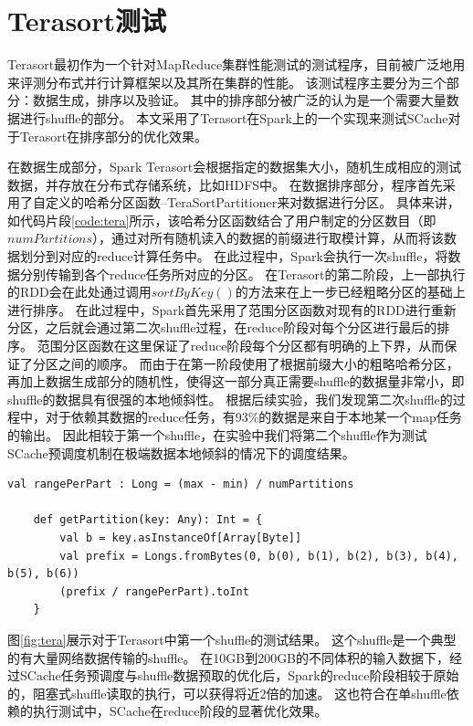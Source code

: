 \section{Terasort测试}

Terasort最初作为一个针对MapReduce集群性能测试的测试程序，目前被广泛地用来评测分布式并行计算框架以及其所在集群的性能。
该测试程序主要分为三个部分：数据生成，排序以及验证。
其中的排序部分被广泛的认为是一个需要大量数据进行shuffle的部分。
本文采用了Terasort在Spark上的一个实现\cite{terasort}来测试SCache对于Terasort在排序部分的优化效果。

在数据生成部分，Spark Terasort会根据指定的数据集大小，随机生成相应的测试数据，并存放在分布式存储系统，比如HDFS中。
在数据排序部分，程序首先采用了自定义的哈希分区函数--TeraSortPartitioner来对数据进行分区。
具体来讲，如代码片段\ref{code:tera}所示，该哈希分区函数结合了用户制定的分区数目（即$numPartitions$），通过对所有随机读入的数据的前缀进行取模计算，从而将该数据划分到对应的reduce计算任务中。
在此过程中，Spark会执行一次shuffle，将数据分别传输到各个reduce任务所对应的分区。
在Terasort的第二阶段，上一部执行的RDD会在此处通过调用$sortByKey()$的方法来在上一步已经粗略分区的基础上进行排序。
在此过程中，Spark首先采用了范围分区函数对现有的RDD进行重新分区，之后就会通过第二次shuffle过程，在reduce阶段对每个分区进行最后的排序。
范围分区函数在这里保证了reduce阶段每个分区都有明确的上下界，从而保证了分区之间的顺序。
而由于在第一阶段使用了根据前缀大小的粗略哈希分区，再加上数据生成部分的随机性，使得这一部分真正需要shuffle的数据量非常小，即shuffle的数据具有很强的本地倾斜性。
根据后续实验，我们发现第二次shuffle的过程中，对于依赖其数据的reduce任务，有93\%的数据是来自于本地某一个map任务的输出。
因此相较于第一个shuffle，在实验中我们将第二个shuffle作为测试SCache预调度机制在极端数据本地倾斜的情况下的调度结果。

\begin{lstlisting}[style={myScalastyle}, caption={Terasort哈希分区函数代码(Scala)}, label={code:tera}]
    val rangePerPart : Long = (max - min) / numPartitions

    def getPartition(key: Any): Int = {
        val b = key.asInstanceOf[Array[Byte]]
        val prefix = Longs.fromBytes(0, b(0), b(1), b(2), b(3), b(4), b(5), b(6))
        (prefix / rangePerPart).toInt
    }
\end{lstlisting}

图\ref{fig:tera}展示对于Terasort中第一个shuffle的测试结果。
这个shuffle是一个典型的有大量网络数据传输的shuffle。
在10GB到200GB的不同体积的输入数据下，经过SCache任务预调度与shuffle数据预取的优化后，Spark的reduce阶段相较于原始的，阻塞式shuffle读取的执行，可以获得将近2倍的加速。
这也符合在单shuffle依赖的执行测试中，SCache在reduce阶段的显著优化效果。

